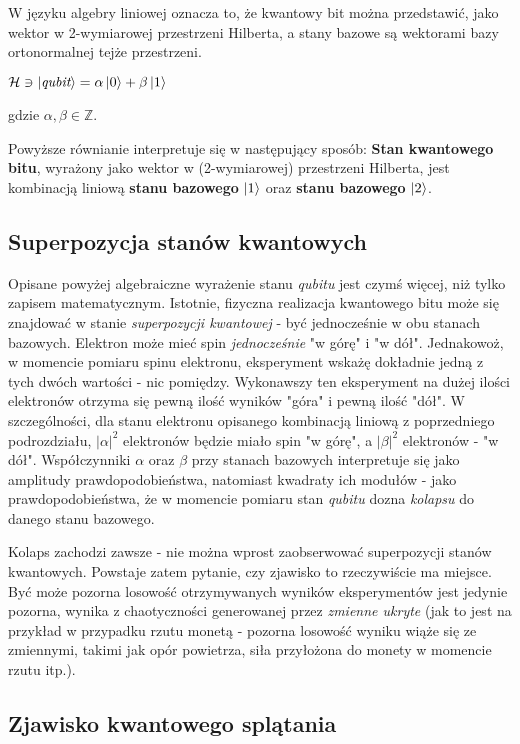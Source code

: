 \documentclass[12pt,a4paper,twoside,openany]{book}
\begin{document}
W języku algebry liniowej oznacza to, że kwantowy bit można przedstawić, jako wektor w 2-wymiarowej przestrzeni Hilberta, a stany bazowe są wektorami bazy ortonormalnej tejże przestrzeni.
\begin{center}
    $\mathcal{H} \ni \ket{\textit{qubit}} = \alpha\ket{0} + \beta\ket{1}$
\end{center}
gdzie $\alpha, \beta \in \mathbb{Z}$.

Powyższe równianie interpretuje się w następujący sposób: \textbf{Stan kwantowego bitu}, wyrażony jako wektor w (2-wymiarowej) przestrzeni Hilberta, jest kombinacją liniową \textbf{stanu bazowego} $\ket{1}$ oraz \textbf{stanu bazowego} $\ket{2}$.

\subsection{Superpozycja stanów kwantowych}

Opisane powyżej algebraiczne wyrażenie stanu \textit{qubitu} jest czymś więcej, niż tylko zapisem matematycznym. Istotnie, fizyczna realizacja kwantowego bitu może się znajdować w stanie \textit{superpozycji kwantowej} - być jednocześnie w obu stanach bazowych. Elektron może mieć spin \textit{jednocześnie} "w górę" i "w dół". Jednakowoż, w momencie pomiaru spinu elektronu, eksperyment wskażę dokładnie jedną z tych dwóch wartości - nic pomiędzy. Wykonawszy ten eksperyment na dużej ilości elektronów otrzyma się pewną ilość wyników "góra" i pewną ilość "dół". W szczególności, dla stanu elektronu opisanego kombinacją liniową z poprzedniego podrozdziału, $|\alpha|^2$ elektronów będzie miało spin "w górę", a $|\beta|^2$ elektronów - "w dół". Współczynniki $\alpha$ oraz $\beta$ przy stanach bazowych interpretuje się jako amplitudy prawdopodobieństwa, natomiast kwadraty ich modułów - jako prawdopodobieństwa, że w momencie pomiaru stan \textit{qubitu} dozna \textit{kolapsu} do danego stanu bazowego.

Kolaps zachodzi zawsze - nie można wprost zaobserwować superpozycji stanów kwantowych. Powstaje zatem pytanie, czy zjawisko to rzeczywiście ma miejsce. Być może pozorna losowość otrzymywanych wyników eksperymentów jest jedynie pozorna, wynika z chaotyczności generowanej przez \textit{zmienne ukryte} (jak to jest na przykład w przypadku rzutu monetą - pozorna losowość wyniku wiąże się ze zmiennymi, takimi jak opór powietrza, siła przyłożona do monety w momencie rzutu itp.). 

\subsection{Zjawisko kwantowego splątania}
\end{document}
